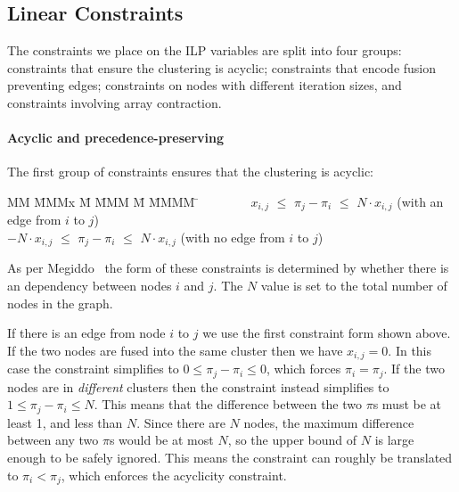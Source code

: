 \subsection{Linear Constraints}
\label{s:LinearConstraints}
The constraints we place on the ILP variables are split into four groups: constraints that ensure the clustering is acyclic; constraints that encode fusion preventing edges; constraints on nodes with different iteration sizes, and constraints involving array contraction. 



\paragraph{Acyclic and precedence-preserving} The first group of constraints ensures that the clustering is acyclic:
\begin{tabbing}
MM  \= MMMx \= M \= MMM \= M \= MMMM \= \kill
    \> ~~~~~~~ $x_{i,j}$ \> $\le$ \> $\pi_j - \pi_i$ \> $\le$ \> $N \cdot x_{i,j}$ 
    \>             (with an edge from $i$ to $j$)            \\
    \> $-N \cdot  x_{i,j}$  \> $\le$ \> $\pi_j - \pi_i$ \> $\le$ \> $N \cdot x_{i,j}$ 
    \>             (with no edge from $i$ to $j$)
\end{tabbing}
As per Megiddo~\cite{megiddo1998optimal} the form of these constraints is determined by whether there is an dependency between nodes $i$ and $j$. The $N$ value is set to the total number of nodes in the graph.

If there is an edge from node $i$ to $j$ we use the first constraint form shown above. If the two nodes are fused into the same cluster then we have $x_{i,j} = 0$. In this case the constraint simplifies to $0 \le \pi_j - \pi_i \le 0$, which forces $\pi_i = \pi_j$. If the two nodes are in \emph{different} clusters then the constraint instead simplifies to $1 \le \pi_j - \pi_i \le N$. This means that the difference between the two $\pi$s must be at least 1, and less than $N$. Since there are $N$ nodes, the maximum difference between any two $\pi$s would be at most $N$, so the upper bound of $N$ is large enough to be safely ignored. This means the constraint can roughly be translated to $\pi_i < \pi_j$, which enforces the acyclicity constraint.

